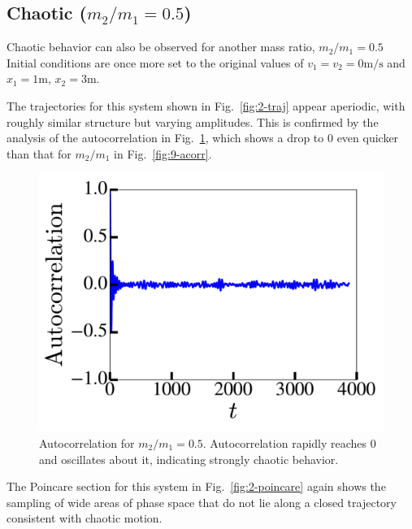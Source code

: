 \documentclass[pra,twocolumn,showpacs,amsmath,amssymb, aps, 10pt]{revtex4-1}
\begin{document}
\subsection{Chaotic ($m_2/m_1 = 0.5$)}\label{sec:chaotic-2}
Chaotic behavior can also be observed for another mass ratio, $m_2/m_1 = 0.5$
Initial conditions are once more set to the original values of
$v_1 = v_2 = 0 \mathrm{m/s}$ and
$x_1 = 1$m, $x_2 = 3$m.

The trajectories for this system shown in
Fig.~\ref{fig:2-traj} appear aperiodic, with roughly similar structure but varying
amplitudes. This is confirmed by the analysis of the autocorrelation in Fig.~\ref{fig:2-acorr},
which shows a drop to 0 even quicker than that for $m_2/m_1$ in Fig.~\ref{fig:9-acorr}.


\begin{figure}
  \includegraphics[width=0.8\linewidth]{r2_0_acorr}
  \caption{Autocorrelation for $m_2/m_1 = 0.5$. Autocorrelation rapidly reaches
  0 and oscillates about it, indicating strongly chaotic behavior.}
  \label{fig:2-acorr}
\end{figure}


The Poincare section for this system in Fig.~\ref{fig:2-poincare} again shows the
sampling of wide areas of phase space that do not lie along a closed trajectory
consistent with chaotic motion.
\end{document}
